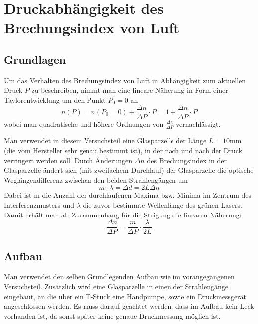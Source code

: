 \documentclass[a4paper, 11pt]{article}
\begin{document}
\clearpage
\section{Druckabhängigkeit des Brechungsindex von Luft}
\subsection{Grundlagen}
Um das Verhalten des Brechungsindex von Luft in Abhängigkeit zum aktuellen Druck $P$ zu beschreiben, nimmt man eine lineare Näherung in Form einer Taylorentwicklung um den Punkt $P_0 = 0$ an
\begin{equation}
n(P) = n ( P_0 = 0) + \frac{\Delta n}{\Delta P}\cdot P = 1 + \frac{\Delta n}{\Delta P} \cdot P
\end{equation}
wobei man quadratische und höhere Ordnungen von $\frac{\Delta n}{\Delta P}$ vernachlässigt.

Man verwendet in diesem Versuchsteil eine Glasparzelle der Länge $L=10$mm (die vom Hersteller sehr genau bestimmt ist), in der nach und nach der Druck verringert werden soll. Durch Änderungen $\Delta n$ des Brechungsindex in der Glasparzelle ändert sich (mit zweifachem Durchlauf) der Glasparzelle die optische Weglängendifferenz zwischen den beiden Strahlengängen um 
\begin{equation}
m \cdot \lambda = \Delta d = 2L \Delta n
\end{equation}
Dabei ist m die Anzahl der durchlaufenen Maxima bzw. Minima im Zentrum des Interferenzmusters und $\lambda$ die zuvor bestimmte Wellenlänge des grünen Lasers. 
Damit erhält man als Zusammenhang für die Steigung die linearen Näherung: 
\begin{equation}
\frac{\Delta n}{\Delta P} = \frac{m}{\Delta P} \cdot \frac{\lambda}{2L}
\end{equation}

\subsection{Aufbau}
Man verwendet den selben Grundlegenden Aufbau wie im vorangegangenen Versuchsteil. Zusätzlich wird eine Glasparzelle in einen der Strahlengänge eingebaut, an die über ein T-Stück eine Handpumpe, sowie ein Druckmessgerät angeschlossen werden. Es muss darauf geachtet werden, dass im Aufbau kein Leck vorhanden ist, da sonst später keine genaue Druckmessung möglich ist.
\end{document}
